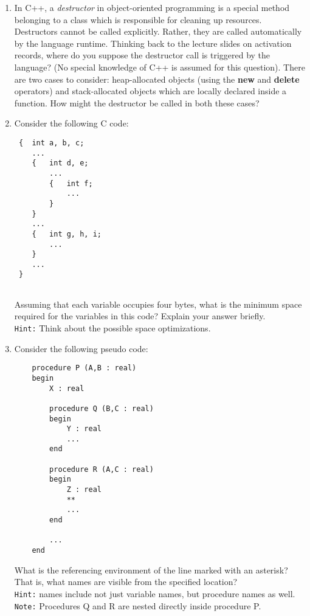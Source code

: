 \documentclass{exam}
\begin{document}
\begin{questions}
\begin{enumerate}
\item In C++, a \emph{destructor} in object-oriented programming is a special method belonging to a class which is responsible for cleaning 
up resources.  Destructors cannot be called explicitly. Rather, they are called automatically by the language runtime.  Thinking back to the lecture slides on activation records, where do you suppose the destructor call is triggered by the language? (No special knowledge of C++ is assumed for this question). There are two cases to consider: heap-allocated objects (using the {\bf new} and {\bf delete} operators) and stack-allocated objects which are locally declared inside a function.  How might the destructor be called in both these cases?

\item Consider the following C code:
\begin{verbatim}
 {  int a, b, c;
    ...
    {   int d, e;
        ...
        {   int f;
            ...
        }
    }
    ...
    {   int g, h, i;
        ...
    }
    ... 
 }
	
\end{verbatim}

Assuming that each variable occupies four bytes, what is the minimum space required for the variables in this code? Explain your answer briefly.\\
\verb|Hint:| Think about the possible space optimizations.

\newpage
\item Consider the following pseudo code:

\begin{verbatim}
    procedure P (A,B : real)
    begin
        X : real
        
        procedure Q (B,C : real) 
        begin
            Y : real
            ...
        end
        
        procedure R (A,C : real)
        begin
            Z : real
            **
            ...
        end
        
        ...
    end
\end{verbatim}
	
What is the referencing environment of the line marked with an asterisk? That is, what names are visible from the specified location?\\
\verb|Hint:| names include not just variable names, but procedure names as well.\\
\verb|Note:| Procedures Q and R are nested directly inside procedure P. 



\end{enumerate}
\end{questions}
\end{document}
